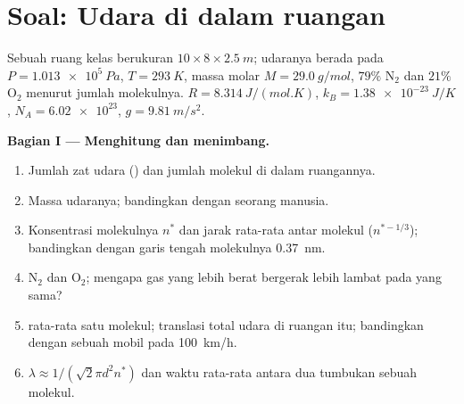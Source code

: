 \section{Soal: Udara di dalam ruangan}

\begin{problem}
\label{pb:b1:kinetic-theory:1}
Sebuah ruang kelas berukuran $10 \times 8 \times \qty{2.5}{m}$; udaranya berada pada
$P = \qty{1.013e5}{Pa}$, $T = \qty{293}{K}$, massa molar $M = \qty{29.0}{g/mol}$,
$79\%$ N$_2$ dan $21\%$ O$_2$ menurut jumlah molekulnya. $R = \qty{8.314}{J/(mol.K)}$,
$k_B = \qty{1.38e-23}{J/K}$, $N_A = \num{6.02e23}$, $g = \qty{9.81}{m/s^2}$.

\medskip
\noindent\textbf{Bagian I --- Menghitung dan menimbang.}
\begin{enumerate}
  \item Jumlah zat udara () dan jumlah molekul di dalam ruangannya.
  \item Massa udaranya; bandingkan dengan seorang manusia.
  \item Konsentrasi molekulnya $n^*$ dan jarak rata-rata antar molekul
        ($n^{*-1/3}$); bandingkan dengan garis tengah molekulnya \qty{0.37}{nm}.
  \item {} N$_2$ dan O$_2$; mengapa gas yang lebih berat
        bergerak lebih lambat pada  yang sama?
  \item {} rata-rata satu molekul;  translasi
        total udara di ruangan itu; bandingkan dengan  sebuah
        mobil pada \qty{100}{km/h}.
  \item {} $\lambda \approx 1/(\sqrt2\pi d^2n^*)$ dan waktu
        rata-rata antara dua tumbukan sebuah molekul.
\end{enumerate}


\end{problem}
